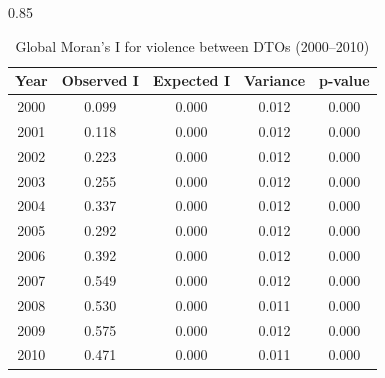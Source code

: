 \documentclass[12pt,letterpaper]{article}
\begin{document}

\newpage

\begin{table}[h]
    \caption{Global Moran's I for violence between DTOs (2000--2010)}
    \label{tab:Global_Moran}
\begin{spacing}{0.85}
    \centering
    \begin{tabular}{ccccc}
    \hline
Year &  Observed I   &    Expected I &    Variance    &    p-value \\ \hline
2000 &    0.099    &    0.000    &    0.012    &    0.000 \\
2001 &    0.118	&	0.000	&	0.012	&	0.000 \\
2002 &	0.223	&	0.000	&	0.012	&	0.000 \\
2003 &	0.255	&	0.000	&	0.012	&	0.000 \\
2004 &	0.337	&	0.000	&	0.012	&	0.000 \\
2005 &	0.292	&	0.000	&	0.012	&	0.000 \\
2006 &	0.392	&	0.000	&	0.012	&	0.000 \\
2007 &	0.549	&	0.000	&	0.012	&	0.000 \\
2008 &	0.530	&	0.000	&	0.011	&	0.000 \\
2009 &	0.575	&	0.000	&	0.012	&	0.000 \\
2010 &	0.471	&	0.000	&	0.011	&	0.000 \\
\hline
\end{tabular}
\end{spacing}
\end{table}



\end{document}

